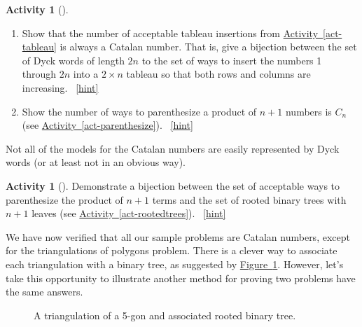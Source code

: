 \documentclass[10pt,]{book}
\theoremstyle{plain}
\theoremstyle{definition}
\theoremstyle{definition}
\theoremstyle{definition}
\newtheorem{activity}[project]{Activity}
\numberwithin{equation}{chapter}
\def\fivegon{%
    \coordinate (a) at (0,2.5);
    \coordinate (b) at (2,1.4);
    \coordinate (c) at (1,0);
    \coordinate (d) at (-.5,0);
    \coordinate (e) at (-2,1.5);
    \draw (a) -- (b) -- (c) -- (d) -- (e) -- (a);
  }
\newcommand{\vtx}[2]{node[fill,circle,inner sep=0pt, minimum size=4pt,label=#1:#2]{}}
\newcommand{\va}[1]{\vtx{above}{#1}}
\newcommand{\vr}[1]{\vtx{right}{#1}}
\newcommand{\vl}[1]{\vtx{left}{#1}}
\renewcommand{\v}{\vtx{above}{}}
\begin{document}
\begin{activity}[]\label{activity-172}
\leavevmode%
\begin{enumerate}[font=\bfseries,label=(\alph*),ref=\alph*]
\item\label{task-189} \hypertarget{p-1015}{}%
Show that the number of acceptable tableau insertions from \hyperref[act-tableau]{Activity~\ref{act-tableau}} is always a Catalan number.  That is, give a bijection between the set of Dyck words of length \(2n\) to the set of ways to insert the numbers 1 through \(2n\) into a \(2\times n\) tableau so that both rows and columns are increasing.%
~\hfill{\tiny\hyperlink{a-179.a}{[hint]}\hypertarget{q-179.a}{}}\item\label{task-190} \hypertarget{p-1017}{}%
Show the number of ways to parenthesize a product of \(n+1\) numbers is \(C_n\) (see \hyperref[act-parenthesize]{Activity~\ref{act-parenthesize}}).%
~\hfill{\tiny\hyperlink{a-179.b}{[hint]}\hypertarget{q-179.b}{}}\end{enumerate}
\end{activity}
\hypertarget{p-1019}{}%
Not all of the models for the Catalan numbers are easily represented by Dyck words (or at least not in an obvious way).%
\begin{activity}[]\label{activity-173}
\hypertarget{p-1020}{}%
Demonstrate a bijection between the set of acceptable ways to parenthesize the product of \(n+1\) terms and the set of rooted binary trees with \(n+1\) leaves (see \hyperref[act-rootedtrees]{Activity~\ref{act-rootedtrees}}).%
~\hfill{\tiny\hyperlink{a-180}{[hint]}\hypertarget{q-180}{}}\end{activity}
\hypertarget{p-1022}{}%
We have now verified that all our sample problems are Catalan numbers, except for the triangulations of polygons problem.  There is a clever way to associate each triangulation with a binary tree, as suggested by \hyperref[fig-triangulationtree]{Figure~\ref{fig-triangulationtree}}.  However, let's take this opportunity to illustrate another method for proving two problems have the same answers.%
\begin{figure}
\centering
\begin{sidebyside}{2}{0.125}{0.125}{0.25}
\begin{sbspanel}{0.25}
\end{sbspanel}
\begin{sbspanel}{0.25}
\end{sbspanel}
\end{sidebyside}
\caption{A triangulation of a 5-gon and associated rooted binary tree.\label{fig-triangulationtree}}
\end{figure}
\end{document}
